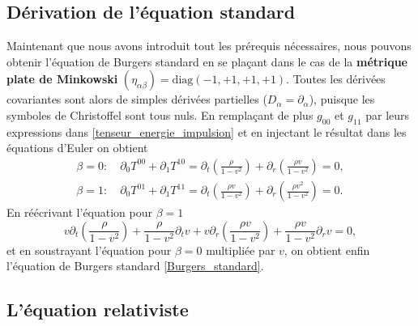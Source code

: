 \documentclass[11pt,a4paper]{article}
\begin{document}
\subsection{Dérivation de l'équation standard}

Maintenant que nous avons introduit tout les prérequis nécessaires, nous pouvons obtenir l'équation de Burgers standard en se plaçant dans le cas de la \textbf{métrique plate de Minkowski} $(\eta_{\alpha\beta}) = \mathrm{diag}(-1,+1,+1,+1)$. Toutes les dérivées covariantes sont alors de simples dérivées partielles ($D_\alpha = \partial_\alpha$), puisque les symboles de Christoffel sont tous nuls. En remplaçant de plus $g_{00}$ et $g_{11}$ par leurs expressions dans \eqref{tenseur_energie_impulsion} et en injectant le résultat dans les équations d'Euler on obtient
\begin{align}
	\beta = 0 : \quad\partial_0 T^{00} + \partial_1 T^{10} = \partial_t (\frac{\rho}{1- v^2}) + \partial_r (\frac{\rho v}{1 - v^2}) = 0, \\
	\beta = 1 : \quad\partial_0 T^{01} + \partial_1 T^{11} = \partial_t (\frac{\rho v}{1 - v^2}) + \partial_r(\frac{\rho v^2}{1- v^2}) = 0.
\end{align}
En réécrivant l'équation pour $\beta = 1$
\begin{equation}
	v\partial_t (\frac{\rho }{1 - v^2}) + \frac{\rho }{1 - v^2}\partial_t v + v\partial_r(\frac{\rho v}{1- v^2}) + \frac{\rho v}{1- v^2}\partial_r v = 0,
\end{equation}
et en soustrayant l'équation pour $\beta = 0$ multipliée par $v$, on obtient enfin l'équation de Burgers standard \eqref{Burgers_standard}.

\subsection{L'équation relativiste}
\end{document}
